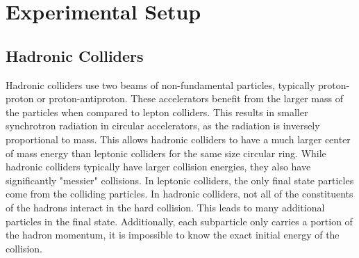 \chapter{Experimental Setup}
\section{Hadronic Colliders}
Hadronic colliders use two beams of non-fundamental particles, typically proton-proton or proton-antiproton. These accelerators benefit from the larger mass of the particles when compared to lepton colliders. This results in smaller synchrotron radiation in circular accelerators, as the radiation is inversely proportional to mass. This allows hadronic colliders to have a much larger center of mass energy than leptonic colliders for the same size circular ring. \newline
\indent While hadronic colliders typically have larger collision energies, they also have significantly "messier" collisions. In leptonic colliders, the only final state particles come from the colliding particles. In hadronic colliders, not all of the constituents of the hadrons interact in the hard collision. This leads to many additional particles in the final state. Additionally, each subparticle only carries a portion of the hadron momentum, it is impossible to know the exact initial energy of the collision. 


